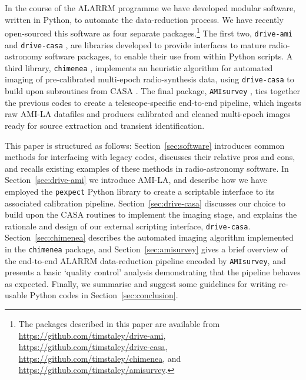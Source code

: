\documentclass[5p,authoryear]{elsarticle}
\begin{document}
In the course of the ALARRM programme we have developed modular software, written in Python, to automate the data-reduction process. 
We have recently open-sourced this software as four separate packages.\footnote{%
The packages described in this paper are available from\\
\url{https://github.com/timstaley/drive-ami},\\
\url{https://github.com/timstaley/drive-casa},\\
\url{https://github.com/timstaley/chimenea}, and\\
\url{https://github.com/timstaley/amisurvey}.
}
The first two, \texttt{drive-ami} and \texttt{drive-casa} \citep{Staley2015_amisurvey, Staley2015_drivecasa}, are libraries developed to provide interfaces to mature radio-astronomy software packages, to enable their use from within Python scripts.
A third library, \texttt{chimenea} \citep{Staley2015_chimenea}, implements an heuristic algorithm for automated imaging of pre-calibrated multi-epoch radio-synthesis data, using \texttt{drive-casa} to build upon subroutines from CASA \citep[the Common Astronomy Software Applications package,][]{McMullin2007, Casa2011}.
The final package, \texttt{AMIsurvey} \citep{Staley2015_amisurvey}, ties together the previous codes to create a telescope-specific end-to-end pipeline, which ingests raw AMI-LA datafiles and produces calibrated and cleaned multi-epoch images ready for source extraction and transient identification.

This paper is structured as follows: 
Section~\ref{sec:software} introduces common methods for 
interfacing with legacy codes, discusses their relative pros and cons, 
and recalls existing examples of these 
methods in radio-astronomy software. 
% 
In Section~\ref{sec:drive-ami} we introduce AMI-LA, and describe how we have employed the \texttt{pexpect} Python library to create a scriptable interface to its associated calibration pipeline.
% 
Section~\ref{sec:drive-casa} discusses our choice to build upon the CASA routines to implement the imaging stage, and explains the rationale and design of our external
scripting interface, \texttt{drive-casa}.
Section~\ref{sec:chimenea} describes the automated imaging algorithm implemented in the \texttt{chimenea} package, and Section~\ref{sec:amisurvey} gives a brief overview of the end-to-end ALARRM data-reduction pipeline encoded by \texttt{AMIsurvey}, and presents a basic `quality control' analysis demonstrating that the pipeline behaves as expected.
Finally, we summarise and suggest some guidelines for writing re-usable Python codes in Section~\ref{sec:conclusion}.
\end{document}
